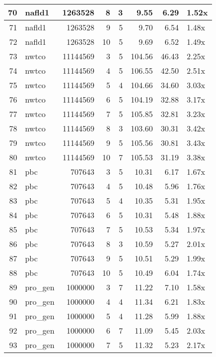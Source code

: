 \begin{table}[ht]
\begin{tabular}{rlrrrrrl}
   \hline
70 & nafld1 & 1263528 &   8 &   3 & 9.55 & 6.29 & 1.52x \\ 
   \hline
71 & nafld1 & 1263528 &   9 &   5 & 9.70 & 6.54 & 1.48x \\ 
   \hline
72 & nafld1 & 1263528 &  10 &   5 & 9.69 & 6.52 & 1.49x \\ 
   \hline
73 & nwtco & 11144569 &   3 &   5 & 104.56 & 46.43 & 2.25x \\ 
   \hline
74 & nwtco & 11144569 &   4 &   5 & 106.55 & 42.50 & 2.51x \\ 
   \hline
75 & nwtco & 11144569 &   5 &   4 & 104.66 & 34.60 & 3.03x \\ 
   \hline
76 & nwtco & 11144569 &   6 &   5 & 104.19 & 32.88 & 3.17x \\ 
   \hline
77 & nwtco & 11144569 &   7 &   5 & 105.85 & 32.81 & 3.23x \\ 
   \hline
78 & nwtco & 11144569 &   8 &   3 & 103.60 & 30.31 & 3.42x \\ 
   \hline
79 & nwtco & 11144569 &   9 &   5 & 105.56 & 30.81 & 3.43x \\ 
   \hline
80 & nwtco & 11144569 &  10 &   7 & 105.53 & 31.19 & 3.38x \\ 
   \hline
81 & pbc & 707643 &   3 &   5 & 10.31 & 6.17 & 1.67x \\ 
   \hline
82 & pbc & 707643 &   4 &   5 & 10.48 & 5.96 & 1.76x \\ 
   \hline
83 & pbc & 707643 &   5 &   4 & 10.35 & 5.31 & 1.95x \\ 
   \hline
84 & pbc & 707643 &   6 &   5 & 10.31 & 5.48 & 1.88x \\ 
   \hline
85 & pbc & 707643 &   7 &   5 & 10.53 & 5.34 & 1.97x \\ 
   \hline
86 & pbc & 707643 &   8 &   3 & 10.59 & 5.27 & 2.01x \\ 
   \hline
87 & pbc & 707643 &   9 &   5 & 10.51 & 5.29 & 1.99x \\ 
   \hline
88 & pbc & 707643 &  10 &   5 & 10.49 & 6.04 & 1.74x \\ 
   \hline
89 & pro\_gen & 1000000 &   3 &   7 & 11.22 & 7.10 & 1.58x \\ 
   \hline
90 & pro\_gen & 1000000 &   4 &   4 & 11.34 & 6.21 & 1.83x \\ 
   \hline
91 & pro\_gen & 1000000 &   5 &   4 & 11.28 & 5.99 & 1.88x \\ 
   \hline
92 & pro\_gen & 1000000 &   6 &   7 & 11.09 & 5.45 & 2.03x \\ 
   \hline
93 & pro\_gen & 1000000 &   7 &   5 & 11.32 & 5.23 & 2.17x \\ 

\end{tabular}
\end{table}
